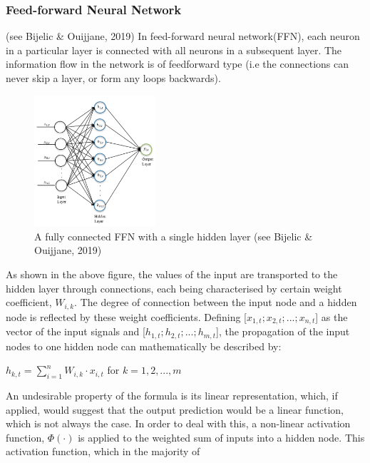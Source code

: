 \documentclass[a4paper,11pt,oneside]{book}
\begin{document}
 \subsubsection{Feed-forward Neural Network} (see Bijelic \& Ouijjane, 2019)
 In feed-forward neural network(FFN), each neuron in a
 particular layer is connected with all neurons in a subsequent layer. The information
 flow in the network is of feedforward type (i.e the connections
 can never skip a layer, or form any loops backwards).\newline
 \begin{figure}
 	\centering
 	\includegraphics[width=0.4\textwidth]{figures/FFN}
 	\caption{A fully connected FFN with a single hidden layer (see Bijelic \& Ouijjane, 2019)}
 	
 	\label{sixthfig}
 \end{figure}
\newline
 As shown in the above figure, the values of the input are transported to the hidden layer through connections, each being characterised by certain weight coefficient, $W_{i,k}$. The degree of connection between the input node and a hidden node is reflected by these weight coefficients. Defining [$x_{1,t};x_{2,t};...;x_{n,t}$] as the vector of the input signals and [$h_{1,t};h_{2,t};...;h_{m,t}$], the propagation of the input nodes to one hidden node can
 mathematically be described by: \newline
 \begin{center}


 $h_{k,t} =\sum_{i=1}^{n} W_{i,k} \cdot x_{i,t}$ for $k = 1,2,...,m$
  \end{center}
An undesirable property of the formula is its linear representation,
which, if applied, would suggest that the output prediction would be a linear function, which is not always the case. In order to deal with this, a non-linear activation function, $\Phi(\cdot)$ is applied to the weighted sum of
inputs into a hidden node. This activation function, which in the majority of
\end{document}
